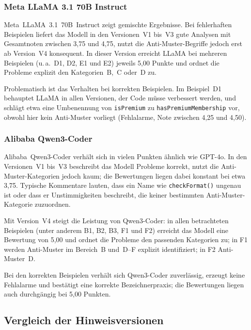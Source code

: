 \documentclass[a4paper,12pt]{article}
\begin{document}
\subsubsection{Meta LLaMA 3.1 70B Instruct}

Meta~LLaMA~3.1~70B~Instruct zeigt gemischte Ergebnisse. Bei fehlerhaften Beispielen liefert das Modell in den Versionen~V1 bis~V3 gute Analysen mit Gesamtnoten zwischen 3{,}75 und 4{,}75, nutzt die Anti-Muster-Begriffe jedoch erst ab Version~V4 konsequent. In dieser Version erreicht LLaMA bei mehreren Beispielen (u.\,a.~D1, D2, E1 und E2) jeweils 5{,}00 Punkte und ordnet die Probleme explizit den Kategorien~B,~C oder~D zu.

Problematisch ist das Verhalten bei korrekten Beispielen. Im Beispiel~D1 behauptet LLaMA in allen Versionen, der Code müsse verbessert werden, und schlägt etwa eine Umbenennung von \texttt{isPremium} zu \texttt{hasPremiumMembership} vor, obwohl hier kein Anti-Muster vorliegt (Fehlalarme, Note zwischen 4{,}25 und 4{,}50).

\subsubsection{Alibaba Qwen3-Coder}

Alibaba~Qwen3-Coder verhält sich in vielen Punkten ähnlich wie GPT-4o. In den Versionen~V1 bis~V3 beschreibt das Modell Probleme korrekt, nutzt die Anti-Muster-Kategorien jedoch kaum; die Bewertungen liegen dabei konstant bei etwa 3{,}75. Typische Kommentare lauten, dass ein Name wie \texttt{checkFormat()} ungenau ist oder dass er Unstimmigkeiten beschreibt, die keiner bestimmten Anti-Muster-Kategorie zuzuordnen.

Mit Version~V4 steigt die Leistung von Qwen3-Coder: in allen betrachteten Beispielen (unter anderem B1, B2, B3, F1 und F2) erreicht das Modell eine Bewertung von 5{,}00 und ordnet die Probleme den passenden Kategorien zu; in F1 werden Anti-Muster im Bereich~B und~D--F explizit identifiziert; in F2 Anti-Muster~D.

Bei den korrekten Beispielen verhält sich Qwen3-Coder zuverlässig, erzeugt keine Fehlalarme und bestätigt eine korrekte Bezeichnerpraxis; die Bewertungen liegen auch durchgängig bei 5{,}00 Punkten.

\subsection{Vergleich der Hinweisversionen}
\end{document}
